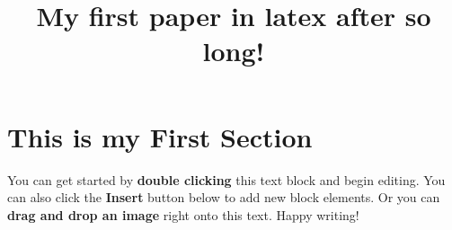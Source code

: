 \documentclass[11pt, twoside, a4paper]{article}
\begin{document}
\title{My first paper in latex after so long!} 

\section{This is my First Section}

You can get started by \textbf{double clicking} this text block and begin editing. You can also click the \textbf{Insert} button below to add new block elements. Or you can \textbf{drag and drop an image} right onto this text. Happy writing!
\end{document}

